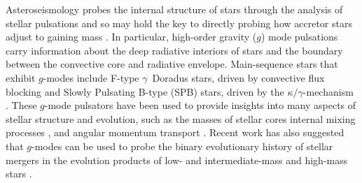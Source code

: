 \documentclass[twocolumn, twocolappendix, oneside]{aastex631}
\newcommand{\gmode}{$g$-mode\xspace}
\newcommand{\gmodes}{$g$-modes\xspace}
\begin{document}

Asteroseismology probes the internal structure of stars through the analysis of stellar pulsations \citep{Aerts+2010} and so may hold the key to directly probing how accretor stars adjust to gaining mass \citep[e.g.][]{Renzo+2021}. %
In particular, high-order gravity ($g$) mode pulsations carry information about the deep radiative interiors of stars and the boundary between the convective core and radiative envelope. Main-sequence stars that exhibit \gmodes include F-type $\gamma$~Doradus stars, driven by convective flux blocking \citep{Guzik+2000} and Slowly Pulsating B-type (SPB) stars, driven by the $\kappa/\gamma$-mechanism \citep{Waelkens+1985, Waelkens+1991, Cox+1992, Pamyatnykh+1999}.
These \gmode pulsators have been used to provide insights into many aspects of stellar structure and evolution, such as the masses of stellar cores \citep{Johnston+2021, Pedersen+2022} internal mixing processes \citep{Pedersen+2018,Michielsen+2021}, and angular momentum transport \citep{Aerts+2019,Ouazzani2020,Salmon2022,Burssens+2023,Mombarg2023,Moyano2024}. Recent work has also suggested that \gmodes can be used to probe the binary evolutionary history of stellar mergers in the evolution products of low- and intermediate-mass \citep{Rui+2021} and high-mass stars \citep{Bellinger+2023:2023arXiv231100038B}.
\end{document}
